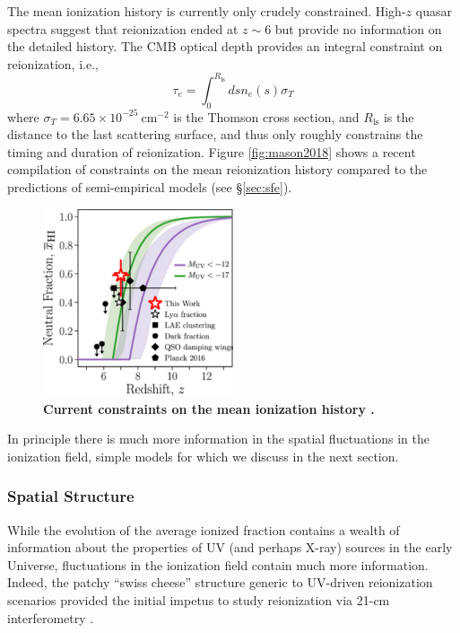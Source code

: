 The mean ionization history is currently only crudely constrained. High-$z$ quasar spectra suggest that reionization ended at $z \sim 6$ but provide no information on the detailed history. The CMB optical depth provides an integral constraint on reionization, i.e.,
\begin{equation}
	\tau_e = \int_0^{R_{\mathrm{ls}}} ds n_e (s) \sigma_T
\end{equation}
where $\sigma_T = 6.65 \times 10^{-25} \ \mathrm{cm}^{-2}$ is the Thomson cross section, and $R_{\mathrm{ls}}$ is the distance to the last scattering surface, and thus only roughly constrains the timing and duration of reionization. Figure \ref{fig:mason2018} shows a recent compilation of constraints on the mean reionization history \cite{Mason2018} compared to the predictions of semi-empirical models (see \S\ref{sec:sfe}). 

\begin{figure}[]
\begin{center}
\includegraphics[width=0.5\textwidth]{Mirocha/mason2018_fig12.pdf} 
\end{center}
\caption{{\bf Current constraints on the mean ionization history \cite{Mason2018}.}}
\label{fig:fzh04}
\end{figure}

In principle there is much more information in the spatial fluctuations in the ionization field, simple models for which we discuss in the next section.



\subsubsection{Spatial Structure} \label{sec:ionization_local}
While the evolution of the average ionized fraction contains a wealth of information about the properties of UV (and perhaps X-ray) sources in the early Universe, fluctuations in the ionization field contain much more information. Indeed, the patchy ``swiss cheese'' structure generic to UV-driven reionization scenarios provided the initial impetus to study reionization via 21-cm interferometry \cite{Madau1997}.

